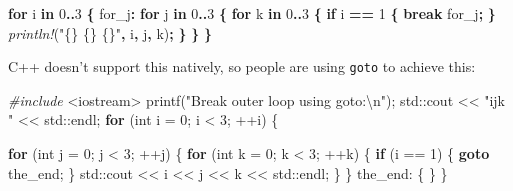 \documentclass[
]{book}
\newenvironment{Shaded}{\begin{snugshade}}{\end{snugshade}}
\newcommand{\BuiltInTok}[1]{#1}
\newcommand{\ControlFlowTok}[1]{\textcolor[rgb]{0.13,0.29,0.53}{\textbf{#1}}}
\newcommand{\DataTypeTok}[1]{\textcolor[rgb]{0.13,0.29,0.53}{#1}}
\newcommand{\DecValTok}[1]{\textcolor[rgb]{0.00,0.00,0.81}{#1}}
\newcommand{\ImportTok}[1]{#1}
\newcommand{\KeywordTok}[1]{\textcolor[rgb]{0.13,0.29,0.53}{\textbf{#1}}}
\newcommand{\NormalTok}[1]{#1}
\newcommand{\OperatorTok}[1]{\textcolor[rgb]{0.81,0.36,0.00}{\textbf{#1}}}
\newcommand{\OtherTok}[1]{\textcolor[rgb]{0.56,0.35,0.01}{#1}}
\newcommand{\PreprocessorTok}[1]{\textcolor[rgb]{0.56,0.35,0.01}{\textit{#1}}}
\newcommand{\SpecialCharTok}[1]{\textcolor[rgb]{0.00,0.00,0.00}{#1}}
\newcommand{\StringTok}[1]{\textcolor[rgb]{0.31,0.60,0.02}{#1}}
\begin{document}
\begin{Shaded}
\begin{Highlighting}[]
\KeywordTok{for}\NormalTok{ i }\KeywordTok{in} \DecValTok{0}\OperatorTok{..}\DecValTok{3} \OperatorTok{\{}
    \OtherTok{\textquotesingle{}for\_j}\OperatorTok{:} \KeywordTok{for}\NormalTok{ j }\KeywordTok{in} \DecValTok{0}\OperatorTok{..}\DecValTok{3} \OperatorTok{\{}
        \KeywordTok{for}\NormalTok{ k }\KeywordTok{in} \DecValTok{0}\OperatorTok{..}\DecValTok{3} \OperatorTok{\{}
            \KeywordTok{if}\NormalTok{ i }\OperatorTok{==} \DecValTok{1} \OperatorTok{\{}
                \KeywordTok{break} \OtherTok{\textquotesingle{}for\_j}\OperatorTok{;}
            \OperatorTok{\}}
            \PreprocessorTok{println!}\NormalTok{(}\StringTok{"\{\} \{\} \{\}"}\OperatorTok{,}\NormalTok{ i}\OperatorTok{,}\NormalTok{ j}\OperatorTok{,}\NormalTok{ k)}\OperatorTok{;}
        \OperatorTok{\}}
    \OperatorTok{\}}
\OperatorTok{\}}
\end{Highlighting}
\end{Shaded}

C++ doesn't support this natively, so people are using \texttt{goto} to achieve this:

\begin{Shaded}
\begin{Highlighting}[]
\PreprocessorTok{\#include }\ImportTok{\textless{}iostream\textgreater{}}
\NormalTok{printf(}\StringTok{"Break outer loop using goto:}\SpecialCharTok{\textbackslash{}n}\StringTok{"}\NormalTok{);}
\BuiltInTok{std::}\NormalTok{cout \textless{}\textless{} }\StringTok{"ijk "}\NormalTok{ \textless{}\textless{} }\BuiltInTok{std::}\NormalTok{endl;}
\ControlFlowTok{for}\NormalTok{ (}\DataTypeTok{int}\NormalTok{ i = }\DecValTok{0}\NormalTok{; i \textless{} }\DecValTok{3}\NormalTok{; ++i)}
\NormalTok{\{}

    \ControlFlowTok{for}\NormalTok{ (}\DataTypeTok{int}\NormalTok{ j = }\DecValTok{0}\NormalTok{; j \textless{} }\DecValTok{3}\NormalTok{; ++j)}
\NormalTok{    \{}
        \ControlFlowTok{for}\NormalTok{ (}\DataTypeTok{int}\NormalTok{ k = }\DecValTok{0}\NormalTok{; k \textless{} }\DecValTok{3}\NormalTok{; ++k)}
\NormalTok{        \{}
            \ControlFlowTok{if}\NormalTok{ (i == }\DecValTok{1}\NormalTok{)}
\NormalTok{            \{}
                \ControlFlowTok{goto}\NormalTok{ the\_end;}
\NormalTok{            \}}
            \BuiltInTok{std::}\NormalTok{cout \textless{}\textless{} i \textless{}\textless{} j \textless{}\textless{} k \textless{}\textless{} }\BuiltInTok{std::}\NormalTok{endl;}
\NormalTok{        \}}
\NormalTok{    \}}
\NormalTok{the\_end:}
\NormalTok{\{}
\NormalTok{\}}
\NormalTok{\}}
\end{Highlighting}
\end{Shaded}
\end{document}
